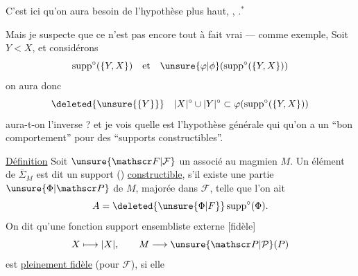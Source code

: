 \clearpage
{}

C'est  ici qu'on aura besoin de l'hypothèse plus haut,  , .$^{*}$

Mais je suspecte que ce n'est pas encore tout à fait vrai --- comme exemple, Soit $Y<X$, et considérons
\[
\operatorname{supp}^{\circ}(\{Y,X\})\quad\text{et}\quad\unsure{\varphi|\phi}(\operatorname{supp}^{\circ}(\{Y,X\}))
\]
on aura donc
\[
\deleted{\unsure{\{Y\}}}\quad |X|^{\circ}\cup|Y|^{\circ}\subset\varphi(\operatorname{supp}^{\circ}(\{Y,X\}))
\]
aura-t-on l'inverse ?   et je vois  quelle est l'hypothèse générale qui   qu'on a un ``bon comportement'' pour des ``supports  constructibles''.

\uline{Définition} Soit $\unsure{\mathscr F|\mathcal F}$ un  associé au magmien $M$. Un élément  de $\overline\Sigma_M$ est dit un support () \uline{constructible}, s'il existe une  partie $\unsure{\Phi|\mathscr P}$ de $M$, majorée dans $\mathscr F$,  telle que l'on ait
\[
A=\deleted{\unsure{\Phi|F}}\operatorname{supp}^{\circ}(\Phi).
\]
On dit qu'une fonction support ensembliste externe [fidèle]
\[
X\longmapsto|X|,\qquad M\longrightarrow\unsure{\mathscr P|\mathcal P}(P)
\]
est \uline{pleinement fidèle} (pour $\mathscr F$), si elle

